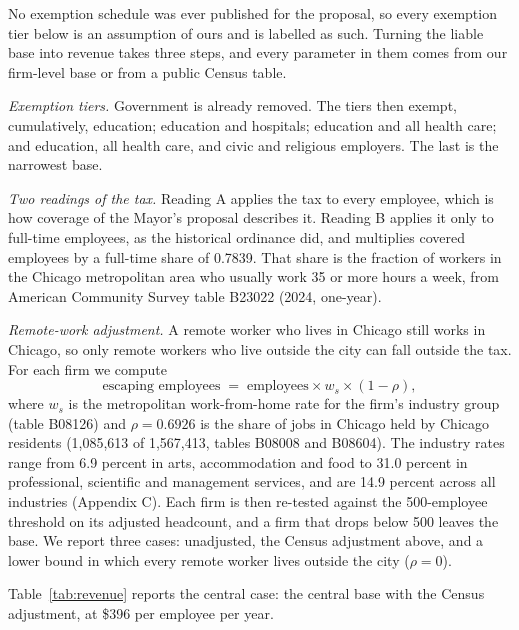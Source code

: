 \documentclass[12pt,letterpaper]{article}
\begin{document}
No exemption schedule was ever published for the proposal, so every exemption tier below is an assumption of ours and is labelled as such. Turning the liable base into revenue takes three steps, and every parameter in them comes from our firm-level base or from a public Census table.

\textit{Exemption tiers.} Government is already removed. The tiers then exempt, cumulatively, education; education and hospitals; education and all health care; and education, all health care, and civic and religious employers. The last is the narrowest base.

\textit{Two readings of the tax.} Reading A applies the tax to every employee, which is how coverage of the Mayor's proposal describes it. Reading B applies it only to full-time employees, as the historical ordinance did, and multiplies covered employees by a full-time share of 0.7839. That share is the fraction of workers in the Chicago metropolitan area who usually work 35 or more hours a week, from American Community Survey table B23022 (2024, one-year).

\textit{Remote-work adjustment.} A remote worker who lives in Chicago still works in Chicago, so only remote workers who live outside the city can fall outside the tax. For each firm we compute
\[
\text{escaping employees} \;=\; \text{employees} \times w_s \times (1-\rho),
\]
where $w_s$ is the metropolitan work-from-home rate for the firm's industry group (table B08126) and $\rho=0.6926$ is the share of jobs in Chicago held by Chicago residents (1,085,613 of 1,567,413, tables B08008 and B08604). The industry rates range from 6.9 percent in arts, accommodation and food to 31.0 percent in professional, scientific and management services, and are 14.9 percent across all industries (Appendix C). Each firm is then re-tested against the 500-employee threshold on its adjusted headcount, and a firm that drops below 500 leaves the base. We report three cases: unadjusted, the Census adjustment above, and a lower bound in which every remote worker lives outside the city ($\rho=0$).

Table~\ref{tab:revenue} reports the central case: the central base with the Census adjustment, at \$396 per employee per year.
\end{document}

